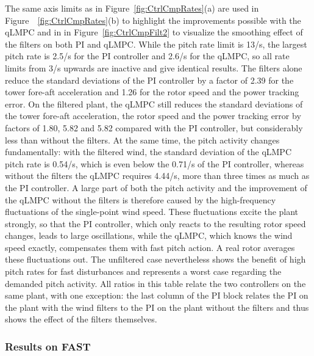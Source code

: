 The same axis limits as in Figure~\ref{fig:CtrlCmpRates}(a) are used in Figure~~\ref{fig:CtrlCmpRates}(b) to highlight the improvements possible with the qLMPC and in in Figure~\ref{fig:CtrlCmpFilt2} to visualize the smoothing effect of the filters on both PI and qLMPC. While the pitch rate limit is 13\textdegree/s, the largest pitch rate is 2.5\textdegree/s for the PI controller and 2.6\textdegree/s for the qLMPC, so all rate limits from 3\textdegree/s upwards are inactive and give identical results. The filters alone reduce the standard deviations of the PI controller by a factor of 2.39 for the tower fore-aft acceleration and 1.26 for the rotor speed and the power tracking error. On the filtered plant, the qLMPC still reduces the standard deviations of the tower fore-aft acceleration, the rotor speed and the power tracking error by factors of 1.80, 5.82 and 5.82 compared with the PI controller, but considerably less than without the filters. At the same time, the pitch activity changes fundamentally: with the filtered wind, the standard deviation of the qLMPC pitch rate is 0.54\textdegree/s, which is even below the 0.71\textdegree/s of the PI controller, whereas without the filters the qLMPC requires 4.44\textdegree/s, more than three times as much as the PI controller. A large part of both the pitch activity and the improvement of the qLMPC without the filters is therefore caused by the high-frequency fluctuations of the single-point wind speed. These fluctuations excite the plant strongly, so that the PI controller, which only reacts to the resulting rotor speed changes, leads to large oscillations, while the qLMPC, which knows the wind speed exactly, compensates them with fast pitch action. A real rotor averages these fluctuations out. The unfiltered case nevertheless shows the benefit of high pitch rates for fast disturbances and represents a worst case regarding the demanded pitch activity.
%
 All ratios in this table relate the two controllers on the same plant, with one exception: the last column of the PI block relates the PI on the plant with the wind filters to the PI on the plant without the filters and thus shows the effect of the filters themselves.

\subsubsection{Results on FAST}\label{subsubsec:qLMPCFASTresults}

